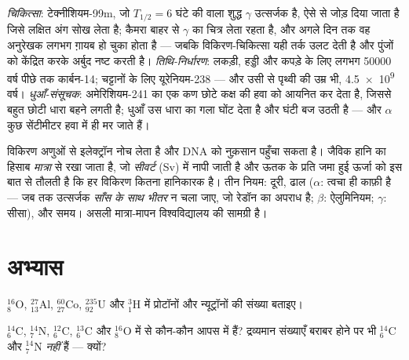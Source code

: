 \begin{example}[अस्थिर नाभिक के तीन पेशे]\label{ex:g11:nucleus-radioactivity:uses}
\emph{चिकित्सा}: टेक्नीशियम-99m, जो $T_{1/2} = 6$ घंटे की  वाला शुद्ध
$\gamma$ उत्सर्जक है, ऐसे  से जोड़ दिया जाता है जिसे लक्षित अंग
सोख लेता है; कैमरा बाहर से $\gamma$ का चित्र लेता रहता है, और अगले दिन तक वह
अनुरेखक लगभग ग़ायब हो चुका होता है --- जबकि विकिरण-चिकित्सा यही तर्क उलट देती
है और पुंजों को केंद्रित करके अर्बुद नष्ट करती है। \emph{तिथि-निर्धारण}:
लकड़ी, हड्डी और कपड़े के लिए लगभग \num{50000} वर्ष पीछे तक कार्बन-14; चट्टानों के
लिए यूरेनियम-238 --- और उसी से पृथ्वी की उम्र भी, \num{4.5e9} वर्ष।
\emph{धुआँ-संसूचक}: अमेरिशियम-241 का एक कण छोटे कक्ष की हवा को आयनित कर देता
है, जिससे बहुत छोटी धारा बहने लगती है; धुआँ उस धारा का गला घोंट देता है और
घंटी बज उठती है --- और $\alpha$ कुछ सेंटीमीटर हवा में ही मर जाते हैं।
\end{example}

\begin{remark}[मात्रा और सीवर्ट]\label{rem:g11:nucleus-radioactivity:dose}
विकिरण अणुओं से इलेक्ट्रॉन नोच लेता है और DNA को नुक़सान पहुँचा सकता
है। जैविक हानि का हिसाब \emph{मात्रा} से रखा जाता है, जो
\emph{सीवर्ट} (\unit{Sv}) में नापी जाती है और ऊतक के प्रति
 जमा हुई ऊर्जा को इस बात से तौलती है कि हर विकिरण
कितना हानिकारक है। तीन नियम: दूरी, ढाल ($\alpha$: त्वचा ही काफ़ी है ---
जब तक उत्सर्जक \emph{साँस के साथ भीतर} न चला जाए, जो रेडॉन का अपराध है;
$\beta$: ऐलुमिनियम; $\gamma$: सीसा), और समय। असली मात्रा-मापन विश्वविद्यालय की
सामग्री है।
\end{remark}

\section{अभ्यास}

\begin{exercise}[$\star$]\label{exo:g11:nucleus-radioactivity:1}
${}^{16}_{8}\mathrm{O}$, ${}^{27}_{13}\mathrm{Al}$, ${}^{60}_{27}\mathrm{Co}$, ${}^{235}_{92}\mathrm{U}$ और ${}^{3}_{1}\mathrm{H}$ में प्रोटॉनों और न्यूट्रॉनों की
संख्या बताइए।
\end{exercise}

\begin{exercise}[$\star$]\label{exo:g11:nucleus-radioactivity:2}
${}^{14}_{6}\mathrm{C}$, ${}^{14}_{7}\mathrm{N}$, ${}^{12}_{6}\mathrm{C}$, ${}^{13}_{6}\mathrm{C}$ और ${}^{16}_{8}\mathrm{O}$ में से कौन-कौन आपस में
 हैं? द्रव्यमान संख्याएँ बराबर होने पर भी ${}^{14}_{6}\mathrm{C}$
और ${}^{14}_{7}\mathrm{N}$  \emph{नहीं} हैं --- क्यों?
\end{exercise}

